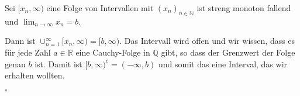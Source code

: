 \documentclass[11pt,a4paper,ngerman]{article}
\begin{document}
Sei $[x_n, \infty)$ eine Folge von Intervallen mit $(x_n)_{n \in \mathbb{N}}$
ist streng monoton fallend und $\lim_{n\rightarrow\infty} x_n = b$.

Dann ist $\cup_{n=1}^\infty [x_n, \infty) = [b, \infty)$. Das Intervall wird
offen und wir wissen, dass es für jede Zahl $a \in \mathbb{R}$ eine Cauchy-Folge in $\mathbb{Q}$ gibt, so dass der Grenzwert der Folge genau $b$ ist.
Damit ist $[b, \infty)^c = (-\infty, b)$ und somit das eine Interval, das wir erhalten wollten.

\mbox{}\hfill$\square$

\label{LastPage}
\end{document}
